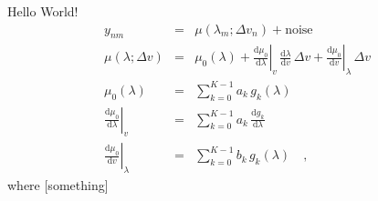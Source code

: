 \documentclass[12pt, letterpaper]{article}
\newcommand{\dd}{\mathrm{d}}
\begin{document}
Hello World!
\begin{eqnarray}
  y_{nm} &=& \mu(\lambda_m; \Delta v_n) + \mathrm{noise}
  \\
  \mu(\lambda; \Delta v) &=& \mu_0(\lambda)
  + \left.\frac{\dd \mu_0}{\dd\lambda}\right|_{v}\,\frac{\dd\lambda}{\dd v}\,\Delta v
  + \left.\frac{\dd \mu_0}{\dd v}\right|_{\lambda}\,\Delta v
  \\
  \mu_0(\lambda) &=& \sum_{k=0}^{K-1} a_k\,g_k(\lambda)
  \\
  \left.\frac{\dd \mu_0}{\dd\lambda}\right|_{v} &=& \sum_{k=0}^{K-1} a_k\,\frac{\dd g_k}{\dd\lambda}
  \\
  \left.\frac{\dd \mu_0}{\dd v}\right|_{\lambda} &=& \sum_{k=0}^{K-1} b_k\,g_k(\lambda)
  \quad ,
\end{eqnarray}
where [something]
\end{document}
